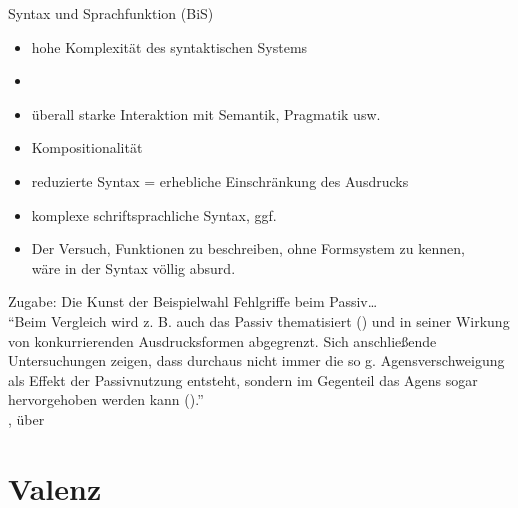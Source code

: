 \begin{frame}
  {Syntax und Sprachfunktion (BiS)}
  \pause
  \begin{itemize}[<+->]
    \item \alert{hohe Komplexität} des syntaktischen Systems
    \item {}
    \item überall \alert{starke Interaktion mit Semantik, Pragmatik usw.}
    \item \alert{Kompositionalität}
      \Zeile
    \item reduzierte Syntax = erhebliche Einschränkung des Ausdrucks
    \item komplexe schriftsprachliche Syntax, ggf.\ 
      \Zeile
    \item Der Versuch, Funktionen zu beschreiben, ohne Formsystem zu kennen,\\
      wäre in der Syntax völlig absurd.
  \end{itemize}
\end{frame}

\begin{frame}
  {Zugabe: Die Kunst der Beispielwahl}
  \pause
  Fehlgriffe beim \alert{Passiv}\ldots\\
  \Zeile
  \pause
  "`Beim Vergleich wird z. B. auch das Passiv thematisiert () und in seiner Wirkung von konkurrierenden Ausdrucksformen abgegrenzt. Sich anschließende Untersuchungen zeigen, dass durchaus nicht immer die so g. Agensverschweigung als Effekt der Passivnutzung entsteht, sondern im Gegenteil das Agens sogar hervorgehoben werden kann ()."'\\
  \Halbzeile
  \citet{Gornik2003}, über \citet{Klotz1995}
\end{frame}


\section{Valenz}


